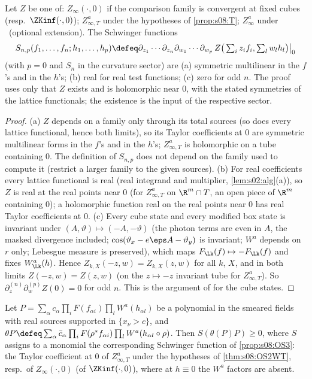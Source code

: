 \begin{proposition}\label{prop:s08:OS3}
Let $Z$ be one of: $Z_\infty(\cdot,0)$ if the comparison family is convergent at fixed cubes (resp.\ $\ZKinf(\cdot,0)$); $Z^a_{\infty,T}$ under the hypotheses of \cref{prop:s08:T}; $Z^a_\infty$ under \Wtwo\ (optional extension). The Schwinger functions
\[
S_{n,p}(f_1,\dots,f_n;h_1,\dots,h_p)\defeq\partial_{z_1}\cdots\partial_{z_n}\partial_{w_1}\cdots\partial_{w_p}\,Z\big(\textstyle\sum_iz_if_i,\sum_lw_lh_l\big)\big|_{0}
\]
(with $p=0$ and $S_n$ in the curvature sector) are (a) symmetric multilinear in the $f$'s and in the $h$'s; (b) real for real test functions; (c) zero for odd $n$. The proof uses only that $Z$ exists and is holomorphic near $0$, with the stated symmetries of the lattice functionals; the existence is the input of the respective sector.
\end{proposition}

\begin{proof}
(a) $Z$ depends on a family only through its total sources (so does every lattice functional, hence both limits), so its Taylor coefficients at $0$ are symmetric multilinear forms in the $f$'s and in the $h$'s; $Z^a_{\infty,T}$ is holomorphic on a tube containing $0$. The definition of $S_{n,p}$ does not depend on the family used to compute it (restrict a larger family to the given sources). (b) For real coefficients every lattice functional is real (real integrand and multiplier, \cref{lem:s02:alg}(a)), so $Z$ is real at the real points near $0$ (for $Z^a_{\infty,T}$ on $\R^m\cap T$, an open piece of $\R^m$ containing $0$); a holomorphic function real on the real points near $0$ has real Taylor coefficients at $0$. (c) Every cube state and every modified box state is invariant under $(A,\vartheta)\mapsto(-A,-\vartheta)$ (the photon terms are even in $A$, the masked divergence included; $\cos(\vartheta_x-e\eps A-\vartheta_y)$ is invariant; $W^a$ depends on $r$ only; Lebesgue measure is preserved), which maps $F_{\Lk}(f)\mapsto-F_{\Lk}(f)$ and fixes $W^a_{\Lk}(h)$. Hence $Z_{k,X}(-z,w)=Z_{k,X}(z,w)$ for all $k$, $X$, and in both limits $Z(-z,w)=Z(z,w)$ (on the $z\mapsto-z$ invariant tube for $Z^a_{\infty,T}$). So $\partial_z^{(n)}\partial_w^{(p)}Z(0)=0$ for odd $n$. This is the argument of \cite[lem:C-OS3lat, thm:C-OS3]{SymPhase} for the cube states.
\end{proof}

\begin{proposition}\label{prop:s08:poly}
Let $P=\sum_\alpha c_\alpha\prod_iF(f_{\alpha i})\prod_lW^a(h_{\alpha l})$ be a polynomial in the smeared fields with real sources supported in $\{x_\nu>c\}$, and $\theta P\defeq\sum_\alpha\bar c_\alpha\prod_iF(\rho^*f_{\alpha i})\prod_lW^a(h_{\alpha l}\circ\rho)$. Then $S(\theta(P)P)\ge0$, where $S$ assigns to a monomial the corresponding Schwinger function of \cref{prop:s08:OS3}: the Taylor coefficient at $0$ of $Z^a_{\infty,T}$ under the hypotheses of \cref{thm:s08:OS2WT}, resp.\ of $Z_\infty(\cdot,0)$ (of $\ZKinf(\cdot,0)$), where at $h\equiv0$ the $W^a$ factors are absent.
\end{proposition}

